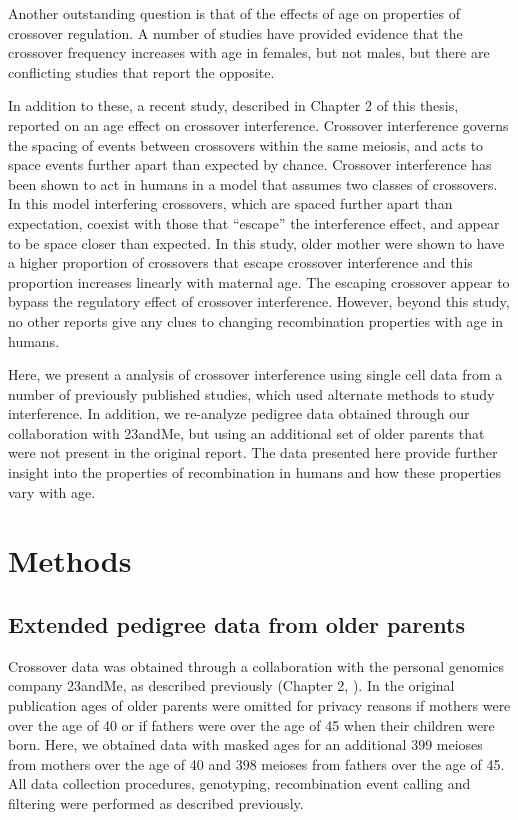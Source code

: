 Another outstanding question is that of the effects of age on properties of crossover regulation.
A number of studies have provided evidence that the crossover frequency increases with age in females, but not males\cite{Kong2004,Martin2015}, but there are conflicting studies that report the opposite\cite{Bleazard2013,Hussin2011}.

In addition to these, a recent study, described in Chapter 2 of this thesis, reported on an age effect on crossover interference.
Crossover interference governs the spacing of events between crossovers within the same meiosis, and acts to space events further apart than expected by chance.
Crossover interference has been shown to act in humans\cite{Broman2000,Housworth2003} in a model that assumes two classes of crossovers.
In this model interfering crossovers, which are spaced further apart than expectation, coexist with those that ``escape'' the interference effect, and appear to be space closer than expected.
In this study, older mother were shown to have a higher proportion of crossovers that escape crossover interference and this proportion increases linearly with maternal age\cite{Campbell2015}.
The escaping crossover appear to bypass the regulatory effect of crossover interference.
However, beyond this study, no other reports give any clues to changing recombination properties with age in humans.

Here, we present a analysis of crossover interference using single cell data from a number of previously published studies, which used alternate methods to study interference.
In addition, we re-analyze pedigree data obtained through our collaboration with 23andMe, but using an additional set of older parents that were not present in the original report.
The data presented here provide further insight into the properties of recombination in humans and how these properties vary with age.



\section{Methods}

\subsection{Extended pedigree data from older parents}
Crossover data was obtained through a collaboration with the personal genomics company 23andMe, as described previously (Chapter 2, \citet{Campbell2015}).
In the original publication ages of older parents were omitted for privacy reasons if mothers were over the age of 40 or if fathers were over the age of 45 when their children were born.
Here, we obtained data with masked ages for an additional 399 meioses from mothers over the age of 40 and 398 meioses from fathers over the age of 45.
All data collection procedures, genotyping, recombination event calling and filtering were performed as described previously.

